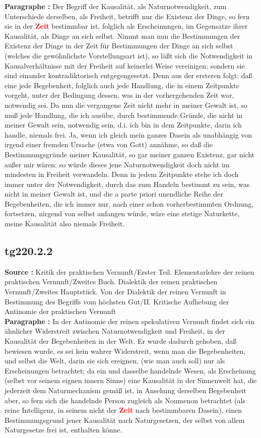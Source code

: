 \documentclass[a4paper,12pt,twoside]{book}
\newcommand{\match}[1]{\textcolor{red}{\textbf{#1}}}
\begin{document}
	\noindent\textbf{Paragraphe : }Der Begriff der Kausalität, als Naturnotwendigkeit, zum Unterschiede derselben, als Freiheit, betrifft nur die Existenz der Dinge, so fern sie in der \match{Zeit} bestimmbar ist, folglich als Erscheinungen, im Gegensatze ihrer Kausalität, als Dinge an sich selbst. Nimmt man nun die Bestimmungen der Existenz der Dinge in der Zeit für Bestimmungen der Dinge an sich selbst (welches die gewöhnlichste Vorstellungsart ist), so läßt sich die Notwendigkeit in Kausalverhältnisse mit der Freiheit auf keinerlei Weise vereinigen; sondern sie sind einander kontradiktorisch entgegengesetzt. Denn aus der ersteren folgt: daß eine jede Begebenheit, folglich auch jede Handlung, die in einem Zeitpunkte vorgeht, unter der Bedingung dessen, was in der vorhergehenden Zeit war, notwendig sei. Da nun die vergangene Zeit nicht mehr in meiner Gewalt ist, so muß jede Handlung, die ich ausübe, durch bestimmende Gründe, die nicht in meiner Gewalt sein, notwendig sein, d.i. ich bin in dem Zeitpunkte, darin ich handle, niemals frei. Ja, wenn ich gleich mein ganzes Dasein als unabhängig von irgend einer fremden Ursache (etwa von Gott) annähme, so daß die Bestimmungsgründe meiner Kausalität, so gar meiner ganzen Existenz, gar nicht außer mir wären: so würde dieses jene Naturnotwendigkeit doch nicht im mindesten in Freiheit verwandeln. Denn in jedem Zeitpunkte stehe ich doch immer unter der Notwendigkeit, durch das zum Handeln bestimmt zu sein, was nicht in meiner Gewalt ist,  und die a parte priori unendliche Reihe der Begebenheiten, die ich immer nur, nach einer schon vorherbestimmten Ordnung, fortsetzen, nirgend von selbst anfangen würde, wäre eine stetige Naturkette, meine Kausalität also niemals Freiheit. 
	
	\subsection*{tg220.2.2} 
	\textbf{Source : }Kritik der praktischen Vernunft/Erster Teil. Elementarlehre der reinen praktischen Vernunft/Zweites Buch. Dialektik der reinen praktischen Vernunft/Zweites Hauptstück. Von der Dialektik der reinen Vernunft in Bestimmung des Begriffs vom höchsten Gut/II. Kritische Aufhebung der Antinomie der praktischen Vernunft\\  
	
	\noindent\textbf{Paragraphe : }In der Antinomie der reinen spekulativen Vernunft findet sich ein ähnlicher Widerstreit zwischen Naturnotwendigkeit und Freiheit, in der Kausalität der Begebenheiten in der Welt. Er wurde dadurch gehoben, daß bewiesen wurde, es sei kein wahrer Widerstreit, wenn man die Begebenheiten, und selbst die Welt, darin sie sich ereignen, (wie man auch soll) nur als Erscheinungen betrachtet; da ein und dasselbe handelnde Wesen, als Erscheinung (selbst vor seinem eignen innern Sinne) eine Kausalität in der Sinnenwelt hat, die jederzeit dem Naturmechanism gemäß ist, in Ansehung derselben Begebenheit aber, so fern sich die handelnde Person zugleich als Noumenon betrachtet (als reine Intelligenz, in seinem nicht der \match{Zeit} nach bestimmbaren Dasein), einen Bestimmungsgrund jener Kausalität nach Naturgesetzen, der selbst von allem Naturgesetze frei ist, enthalten könne. 
	
\end{document}
